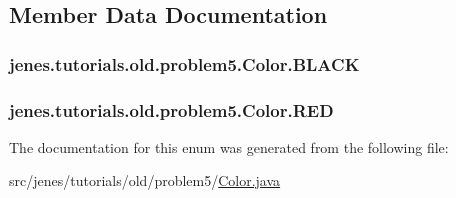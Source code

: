 \subsection{Member Data Documentation}
\hypertarget{enumjenes_1_1tutorials_1_1old_1_1problem5_1_1_color_a8c48229adc1957d055626d3ce74bc22f}{
\subsubsection[{B\-L\-A\-C\-K}]{\setlength{\rightskip}{0pt plus 5cm}jenes.\-tutorials.\-old.\-problem5.\-Color.\-B\-L\-A\-C\-K}}\label{enumjenes_1_1tutorials_1_1old_1_1problem5_1_1_color_a8c48229adc1957d055626d3ce74bc22f}
\hypertarget{enumjenes_1_1tutorials_1_1old_1_1problem5_1_1_color_ad51840590e9a87bd4367c25e5022866b}{
\subsubsection[{R\-E\-D}]{\setlength{\rightskip}{0pt plus 5cm}jenes.\-tutorials.\-old.\-problem5.\-Color.\-R\-E\-D}}\label{enumjenes_1_1tutorials_1_1old_1_1problem5_1_1_color_ad51840590e9a87bd4367c25e5022866b}


The documentation for this enum was generated from the following file\-:\begin{DoxyCompactItemize}
\item 
src/jenes/tutorials/old/problem5/\hyperlink{old_2problem5_2_color_8java}{Color.\-java}\end{DoxyCompactItemize}

